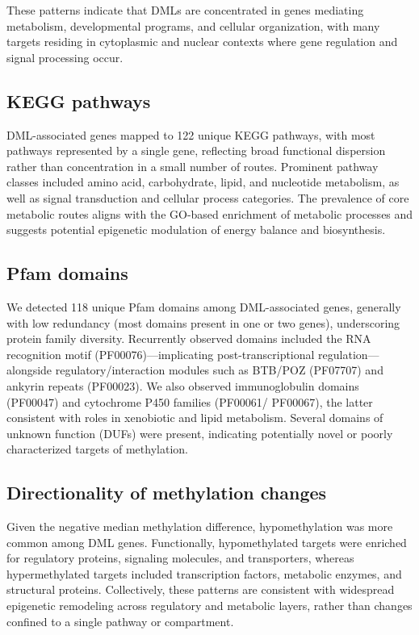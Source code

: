 \documentclass[
]{agujournal2019}
\begin{document}
These patterns indicate that DMLs are concentrated in genes mediating
metabolism, developmental programs, and cellular organization, with many
targets residing in cytoplasmic and nuclear contexts where gene
regulation and signal processing occur.

\subsection{KEGG pathways}\label{kegg-pathways}

DML-associated genes mapped to 122 unique KEGG pathways, with most
pathways represented by a single gene, reflecting broad functional
dispersion rather than concentration in a small number of routes.
Prominent pathway classes included amino acid, carbohydrate, lipid, and
nucleotide metabolism, as well as signal transduction and cellular
process categories. The prevalence of core metabolic routes aligns with
the GO-based enrichment of metabolic processes and suggests potential
epigenetic modulation of energy balance and biosynthesis.

\subsection{Pfam domains}\label{pfam-domains}

We detected 118 unique Pfam domains among DML-associated genes,
generally with low redundancy (most domains present in one or two
genes), underscoring protein family diversity. Recurrently observed
domains included the RNA recognition motif (PF00076)---implicating
post-transcriptional regulation---alongside regulatory/interaction
modules such as BTB/POZ (PF07707) and ankyrin repeats (PF00023). We also
observed immunoglobulin domains (PF00047) and cytochrome P450 families
(PF00061/ PF00067), the latter consistent with roles in xenobiotic and
lipid metabolism. Several domains of unknown function (DUFs) were
present, indicating potentially novel or poorly characterized targets of
methylation.

\subsection{Directionality of methylation
changes}\label{directionality-of-methylation-changes}

Given the negative median methylation difference, hypomethylation was
more common among DML genes. Functionally, hypomethylated targets were
enriched for regulatory proteins, signaling molecules, and transporters,
whereas hypermethylated targets included transcription factors,
metabolic enzymes, and structural proteins. Collectively, these patterns
are consistent with widespread epigenetic remodeling across regulatory
and metabolic layers, rather than changes confined to a single pathway
or compartment.
\end{document}
